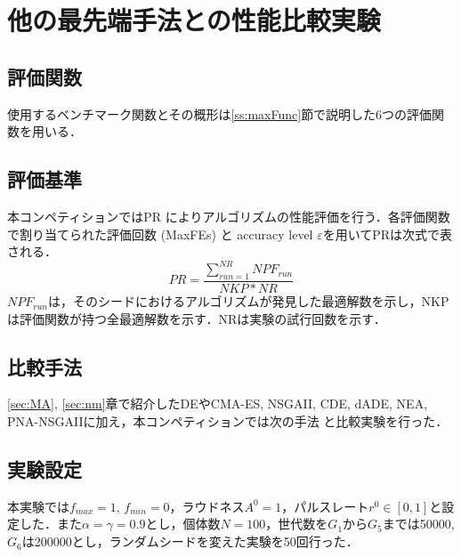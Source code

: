 \documentclass[a4j,11pt]{jarticle}
\begin{document}
\FloatBarrier
\newpage
\section{他の最先端手法との性能比較実験}
\label{sec:experiment}



\subsection{評価関数}
\label{sss:benchmark}
使用するベンチマーク関数とその概形は\ref{ss:maxFunc}節で説明した6つの評価関数を用いる．


\subsection{評価基準}
\label{ss:eval_criteria}
本コンペティションではPR \cite{CEC2013} によりアルゴリズムの性能評価を行う．各評価関数で割り当てられた評価回数 (MaxFEs) と accuracy level $\varepsilon$を用いてPRは次式で表される．
\begin{equation}
\label{eq:PR}
PR=\frac{\sum_{run=1}^{NR}NPF_{run}}{NKP*NR}
\end{equation}
$NPF_{run}$は，そのシードにおけるアルゴリズムが発見した最適解数を示し，NKPは評価関数が持つ全最適解数を示す．NRは実験の試行回数を示す．

\subsection{比較手法}
\ref{sec:MA}, \ref{sec:nm}章で紹介したDEやCMA-ES, NSGAII, CDE, dADE, NEA, PNA-NSGAIIに加え，本コンペティションでは次の手法 \cite{DEs} \cite{N-VMO} と比較実験を行った．

\subsection{実験設定}
本実験では$f_{max}=1$, $f_{min}=0$，ラウドネス$A^0=1$，パルスレート$r^0 \in [0,1]$と設定した．また$\alpha= \gamma = 0.9$とし，個体数$N=100$，世代数を$G_1$から$G_5$までは50000, $G_6$は200000とし，ランダムシードを変えた実験を50回行った．
\end{document}
